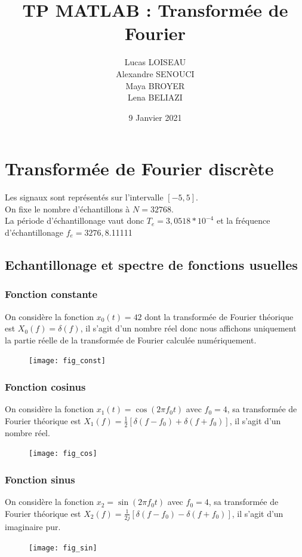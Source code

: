 \documentclass{article}
\title{TP MATLAB : Transformée de Fourier}
\date{9 Janvier 2021}
\author{Lucas LOISEAU \\ Alexandre SENOUCI \\ Maya BROYER \\ Lena BELIAZI}
\begin{document}
\maketitle
\section{Transformée de Fourier discrète}
Les signaux sont représentés sur l'intervalle $[-5,5]$. \\
On fixe le nombre d'échantillons à $N=32768$. \\
La période d'échantillonage vaut donc $T_e = 3,0518 * 10^{-4}$ et la fréquence d'échantillonage $f_e=3276,8$.11111
\subsection{Echantillonage et spectre de fonctions usuelles}
\subsubsection{Fonction constante}
On considère la fonction $x_0(t)=42$ dont la transformée de Fourier théorique est $X_0(f)=\delta(f)$, il s'agit d'un nombre réel donc nous affichons uniquement la partie réelle de la transformée de Fourier calculée numériquement.
\begin{figure}[h]
\texttt{[image: fig\_const]}
\centering
\end{figure}
\subsubsection{Fonction cosinus}
On considère la fonction $x_1(t)=\cos(2\pi f_0 t)$ avec $f_0=4$, sa transformée de Fourier théorique est $X_1(f)=\frac{1}{2}[\delta(f-f_0)+\delta(f+f_0)]$, il s'agit d'un nombre réel.

\begin{figure}[h]
\texttt{[image: fig\_cos]}
\centering
\end{figure}

\subsubsection{Fonction sinus}
On considère la fonction $x_2=\sin(2\pi f_0 t)$ avec $f_0=4$, sa transformée de Fourier théorique est $X_2(f)=\frac{1}{2j}[\delta(f-f_0)-\delta(f+f_0)]$, il s'agit d'un imaginaire pur.
\begin{figure}[h]
\texttt{[image: fig\_sin]}
\centering
\end{figure}
\end{document}
